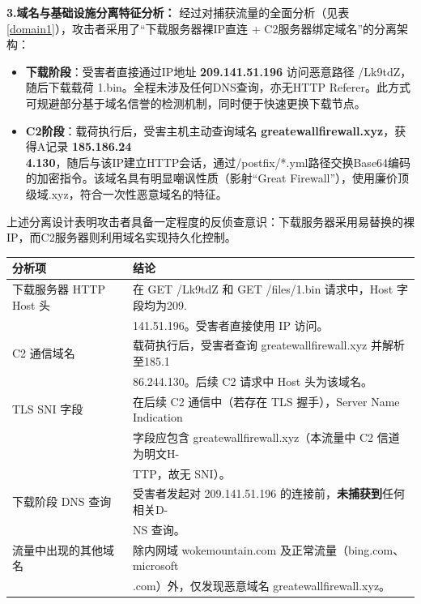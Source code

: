 \documentclass[12pt]{ctexart}
\begin{document}
	\textbf{3.域名与基础设施分离特征分析：}
	经过对捕获流量的全面分析（见表\ref{domain1}），攻击者采用了“下载服务器裸IP直连 + C2服务器绑定域名”的分离架构：
	\begin{itemize}
		\item \textbf{下载阶段}：受害者直接通过IP地址 \textbf{209.141.51.196} 访问恶意路径 /Lk9tdZ，随后下载载荷 1.bin。全程未涉及任何DNS查询，亦无HTTP Referer。此方式可规避部分基于域名信誉的检测机制，同时便于快速更换下载节点。
		\item \textbf{C2阶段}：载荷执行后，受害主机主动查询域名 \textbf{greatewallfirewall.xyz}，获得A记录 \textbf{185.186.24}\\\textbf{4.130}，随后与该IP建立HTTP会话，通过/postfix/*.yml路径交换Base64编码的加密指令。该域名具有明显嘲讽性质（影射“Great Firewall”），使用廉价顶级域.xyz，符合一次性恶意域名的特征。
	\end{itemize}
	上述分离设计表明攻击者具备一定程度的反侦查意识：下载服务器采用易替换的裸IP，而C2服务器则利用域名实现持久化控制。\\
	\noindent
	\begin{minipage}{\linewidth}
		\centering
		\label{domain1}
		\begin{tabular}{ll}
			\toprule
			分析项 & 结论 \\
			\midrule
			下载服务器 HTTP Host 头 & 在 GET /Lk9tdZ 和 GET /files/1.bin 请求中，Host 字段均为209.\\
			& 141.51.196。受害者直接使用 IP 访问。 \\
			C2 通信域名 & 载荷执行后，受害者查询 greatewallfirewall.xyz 并解析至185.1\\
			& 86.244.130。后续 C2 请求中 Host 头为该域名。 \\
			TLS SNI 字段 & 在后续 C2 通信中（若存在 TLS 握手），Server Name Indication\\
			& 字段应包含 greatewallfirewall.xyz（本流量中 C2 信道为明文H-\\
			& TTP，故无 SNI）。 \\
			下载阶段 DNS 查询 & 受害者发起对 209.141.51.196 的连接前，\textbf{未捕获到}任何相关D-\\
			& NS 查询。 \\
			流量中出现的其他域名 & 除内网域 wokemountain.com 及正常流量（bing.com、microsoft\\
			&.com）外，仅发现恶意域名 greatewallfirewall.xyz。 \\
			\bottomrule
		\end{tabular}
	\end{minipage}
	
\end{document}
